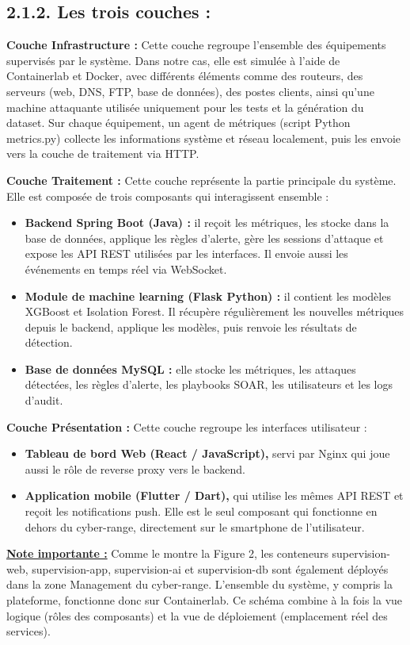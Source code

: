 \documentclass[12pt,a4paper]{report}
\newcommand{\ub}[1]{\uline{\textbf{#1}}}
\begin{document}
\subsection*{2.1.2. Les trois couches :}
\textbf{Couche Infrastructure :} Cette couche regroupe l’ensemble des équipements supervisés par le système. Dans notre cas, elle est simulée à l’aide de Containerlab et Docker, avec différents éléments comme des routeurs, des serveurs (web, DNS, FTP, base de données), des postes clients, ainsi qu’une machine attaquante utilisée uniquement pour les tests et la génération du dataset. Sur chaque équipement, un agent de métriques (script Python metrics.py) collecte les informations système et réseau localement, puis les envoie vers la couche de traitement via HTTP.\par
\textbf{Couche Traitement :} Cette couche représente la partie principale du système. Elle est composée de trois composants qui interagissent ensemble :\par
\begin{itemize}[leftmargin=1.2cm,itemsep=0.25em]
\item \textbf{Backend Spring Boot (Java) :} il reçoit les métriques, les stocke dans la base de données, applique les règles d’alerte, gère les sessions d’attaque et expose les API REST utilisées par les interfaces. Il envoie aussi les événements en temps réel via WebSocket.
\item \textbf{Module de machine learning (Flask Python) :} il contient les modèles XGBoost et Isolation Forest. Il récupère régulièrement les nouvelles métriques depuis le backend, applique les modèles, puis renvoie les résultats de détection.
\item \textbf{Base de données MySQL :} elle stocke les métriques, les attaques détectées, les règles d’alerte, les playbooks SOAR, les utilisateurs et les logs d’audit.
\end{itemize}
\textbf{Couche Présentation :} Cette couche regroupe les interfaces utilisateur :\par
\begin{itemize}[leftmargin=1.2cm,itemsep=0.25em]
\item \textbf{Tableau de bord Web (React / JavaScript),} servi par Nginx qui joue aussi le rôle de reverse proxy vers le backend.
\item \textbf{Application mobile (Flutter / Dart),} qui utilise les mêmes API REST et reçoit les notifications push. Elle est le seul composant qui fonctionne en dehors du cyber-range, directement sur le smartphone de l’utilisateur.
\end{itemize}
\ub{Note importante :} Comme le montre la Figure 2, les conteneurs supervision-web, supervision-app, supervision-ai et supervision-db sont également déployés dans la zone Management du cyber-range. L’ensemble du système, y compris la plateforme, fonctionne donc sur Containerlab. Ce schéma combine à la fois la vue logique (rôles des composants) et la vue de déploiement (emplacement réel des services).\par
\end{document}
